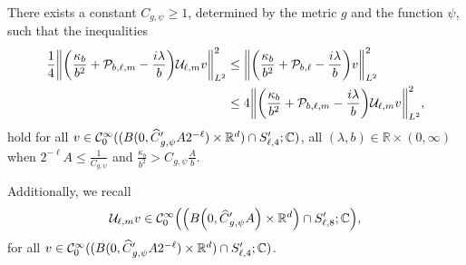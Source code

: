 \documentclass[AHL,Unicode,longabstracts]{cedram}
\newcommand{\C}{\mathbb{C}}
\newcommand{\R}{\mathbb{R}}
\newcommand{\clC}{\mathcal{C}}
\newcommand{\clP}{\mathcal{P}}
\newcommand{\clU}{\mathcal{U}}
\let\oldhat\hat
\renewcommand*{\hat}[1]{\mathchoice{\widehat{#1}}{\widehat{#1}}{\oldhat{#1}}{\oldhat{#1}}}
\let\originalleft\left
\let\originalright\right
\renewcommand{\left}{\mathopen{}\mathclose\bgroup\originalleft}
\renewcommand{\right}{\aftergroup\egroup\originalright}
\begin{document}
\begin{prop}\label{pr:equivNormAfterGaugeChangeOfVariables}
There exists a constant $C_{g,\psi}\geq 1$, determined by the metric $g$ and the function $\psi$, such that the inequalities
\begin{equation}
\begin{aligned}[t]
\frac{1}{4} \left\| \left(\frac{\kappa_{b}}{b^{2}} + \clP_{b,\ell,m} - \frac{i\lambda}{b}\right)\clU_{\ell,m}v \right\|_{L^2}^{2} &\leq \left\| \left(\frac{\kappa_{b}}{b^{2}}+\clP_{b,\ell} - \frac{i\lambda}{b}\right)v \right\|_{L^2}^{2}\\
&\leq 4 \left\| \left(\frac{\kappa_{b}}{b^{2}} + \clP_{b,\ell,m} - \frac{i\lambda}{b}\right)\clU_{\ell,m}v \right\|_{L^2}^{2},
\end{aligned}
\end{equation}
hold for all $v\in \clC_0^\infty((B(0, \hat{C}'_{g,\psi}A2^{-\ell})\times\R^d) \cap S'_{\ell,4};\C)$, all $(\lambda,b)\in \R\times(0,\infty)$ when $2^{-\ell}A\leq \frac{1}{C_{g,\psi}}$ and $\frac{\kappa_b}{b^2}>C_{g,\psi}\frac{A}{b}$.

Additionally, we recall
\[
\clU_{\ell,m}v\in \clC_0^\infty\left(\left(B\left(0, \hat{C}'_{g,\psi}A\right)\times\R^d\right) \cap S'_{\ell,8};\C\right),
\]
for all $v\in \clC_0^\infty((B(0, \hat{C}'_{g,\psi}A2^{-\ell})\times\R^d) \cap S'_{\ell,4};\C)$.
\end{prop}
\end{document}
